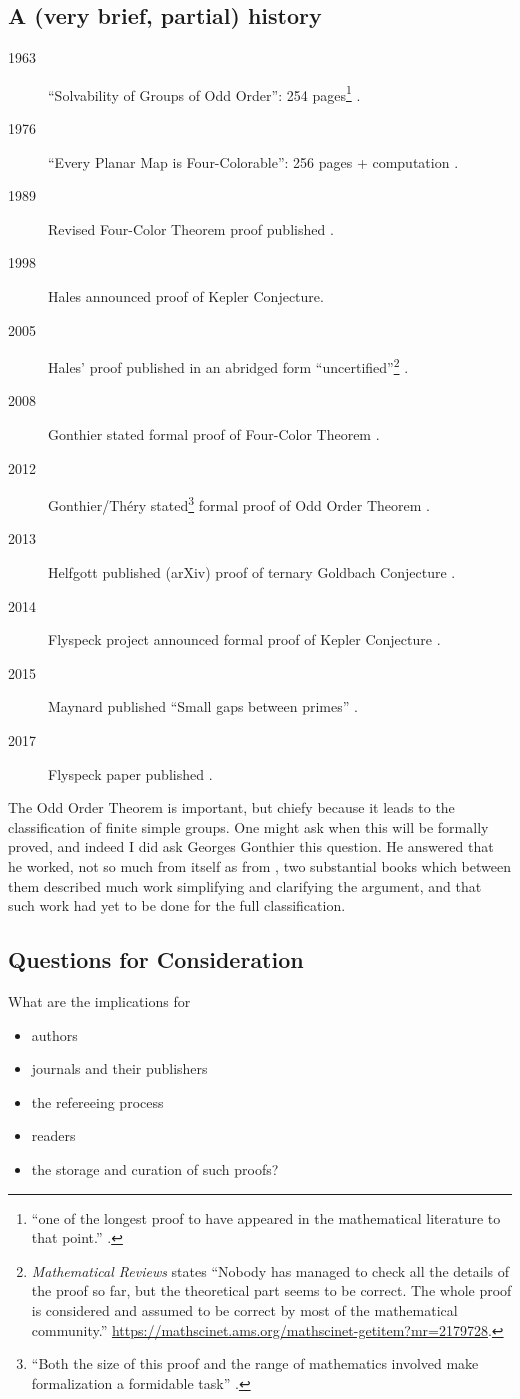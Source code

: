 \subsection{A (very brief, partial) history}
\begin{description}
\item[1963]``Solvability of Groups of Odd Order'': 254 pages\footnote{``one of the longest proof to have appeared in the mathematical literature to that point.'' \cite{Gonthieretal2013a}.} \cite{FeitThompson1963}.
\item[1976]``Every Planar Map is Four-Colorable'': 256 pages + computation \cite{AppelHaken1976a}.
\item[1989]Revised Four-Color Theorem proof published \cite{AppelHaken1989}.
\item[1998]Hales announced proof of Kepler Conjecture.
\item[2005]Hales' proof published in an abridged form ``uncertified''\footnote{\emph{Mathematical Reviews} states ``Nobody has managed to check all the details of the proof so far, but the theoretical part seems to be correct. The whole proof is considered and assumed to be correct by most of the mathematical community.'' \url{https://mathscinet.ams.org/mathscinet-getitem?mr=2179728}.} \cite{Hales2005}.
\item[2008]Gonthier stated formal proof of Four-Color Theorem \cite{Gonthier2008}.
\item[2012]Gonthier/Th\'ery stated\footnote{``Both the size of this proof and the range of mathematics involved make formalization
a formidable task'' \cite{Gonthieretal2013a}.} formal proof of Odd Order Theorem \cite{GonthierThery2012a,Gonthieretal2013a}.
\item[2013]Helfgott published (arXiv) proof of ternary Goldbach Conjecture \cite{Helfgott2013a}.
\item[2014]Flyspeck project announced formal proof of Kepler Conjecture \cite{Hales2014a}.
\item[2015]Maynard published ``Small gaps between primes'' \cite{Maynard2015a}.
\item[2017]Flyspeck paper published \cite{Halesetal2017a}.
\end{description}
The Odd Order Theorem is important, but chiefy because it leads to the classification of finite simple groups. One might ask when this will be formally proved, and indeed I did ask Georges Gonthier this question. He answered that he worked, not so much from \cite{FeitThompson1963} itself as from \cite{Benderetal1994,Peterfalvi2000}, two substantial books which between them described much work simplifying  and clarifying the argument, and that such work had yet to be done for the full classification.
\subsection{Questions for Consideration}
What are the implications for
\begin{itemize}
\item authors
\item journals and their publishers
\item the refereeing process
\item readers
\item the storage and curation of such proofs?%
\end{itemize}

